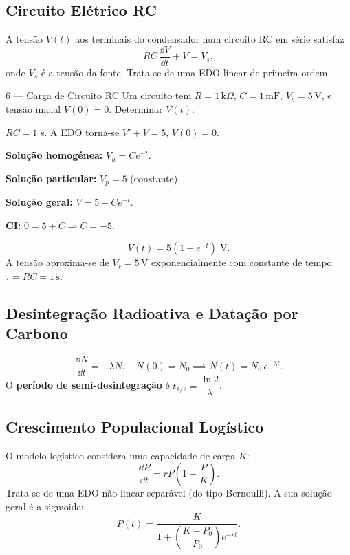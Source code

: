 \subsection{Circuito Elétrico RC}

A tensão $V(t)$ aos terminais do condensador num circuito RC em série satisfaz
\[
  RC\,\frac{\dd V}{\dd t} + V = V_s,
\]
onde $V_s$ é a tensão da fonte. Trata-se de uma EDO linear de primeira ordem.

\begin{exbox}{6 --- Carga de Circuito RC}
  Um circuito tem $R=1\,\mathrm{k}\Omega$, $C=1\,\mathrm{mF}$, $V_s = 5\,\mathrm{V}$,
  e tensão inicial $V(0)=0$. Determinar $V(t)$.
\end{exbox}

\begin{solbox}
  $RC = 1$ s. A EDO torna-se $V' + V = 5$, $V(0)=0$.

  \textbf{Solução homogénea:} $V_h = Ce^{-t}$.

  \textbf{Solução particular:} $V_p = 5$ (constante).

  \textbf{Solução geral:} $V = 5 + Ce^{-t}$.

  \textbf{CI:} $0 = 5 + C \Rightarrow C=-5$.

  \[
    \boxed{V(t) = 5\!\left(1 - e^{-t}\right)\;\mathrm{V}.}
  \]
  A tensão aproxima-se de $V_s = 5\,\mathrm{V}$ exponencialmente com constante de tempo
  $\tau = RC = 1\,\mathrm{s}$.
\end{solbox}

\subsection{Desintegração Radioativa e Datação por Carbono}

\[
  \frac{\dd N}{\dd t} = -\lambda N, \quad N(0)=N_0
  \implies N(t) = N_0\,e^{-\lambda t}.
\]
O \textbf{período de semi-desintegração} é $t_{1/2} = \dfrac{\ln 2}{\lambda}$.

\subsection{Crescimento Populacional Logístico}

O modelo logístico considera uma capacidade de carga $K$:
\[
  \frac{\dd P}{\dd t} = rP\!\left(1-\frac{P}{K}\right).
\]
Trata-se de uma EDO não linear separável (do tipo Bernoulli). A sua solução geral é a sigmoide:
\[
  P(t) = \frac{K}{1 + \!\left(\dfrac{K-P_0}{P_0}\right)\!e^{-rt}}.
\]

